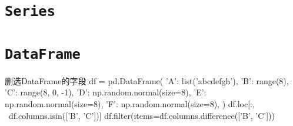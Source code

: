 \chapter{\texttt{Series}}

\chapter{\texttt{DataFrame}}

\begin{py}{删选DataFrame的字段}
df = pd.DataFrame(
    {
        'A': list('abcdefgh'),
        'B': range(8),
        'C': range(8, 0, -1),
        'D': np.random.normal(size=8),
        'E': np.random.normal(size=8),
        'F': np.random.normal(size=8),
    }
)
df.loc[:, ~df.columns.isin(['B', 'C'])]
df.filter(items=df.columns.difference(['B', 'C']))
\end{py}
